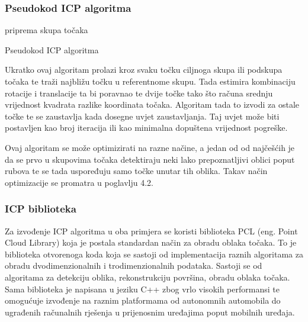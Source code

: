 \subsubsection{Pseudokod ICP algoritma}

\begin{algorithm}[H]
\SetAlgoLined
{}
 priprema skupa točaka\;
 \caption{Pseudokod ICP algoritma}
\end{algorithm}

Ukratko ovaj algoritam prolazi kroz svaku točku ciljnoga skupa ili podskupa točaka te traži najbližu točku u referentnome skupu. Tada estimira kombinaciju rotacije i translacije ta bi poravnao te dvije točke tako što računa srednju vrijednost kvadrata razlike koordinata točaka. Algoritam tada to izvodi za ostale točke te se zaustavlja kada dosegne uvjet zaustavljanja. Taj uvjet može biti postavljen kao broj iteracija ili kao minimalna dopuštena vrijednost pogreške.

Ovaj algoritam se može optimizirati na razne načine, a jedan od od najčešćih je da se prvo u skupovima točaka detektiraju neki lako prepoznatljivi oblici poput rubova te se tada uspoređuju samo točke unutar tih oblika. Takav način optimizacije se promatra u poglavlju 4.2.

\subsubsection{ICP biblioteka}

Za izvođenje ICP algoritma u oba primjera se koristi biblioteka PCL (eng. Point Cloud Library) koja je postala standardan način za obradu oblaka točaka. To je biblioteka otvorenoga koda koja se sastoji od implementacija raznih algoritama za obradu dvodimenzionalnih i trodimenzionalnih podataka. Sastoji se od algoritama za detekciju oblika, rekonstrukciju površina, obradu oblaka točaka. Sama biblioteka je napisana u jeziku C++ zbog vrlo visokih performansi te omogućuje izvođenje na raznim platformama od autonomnih automobila do ugrađenih računalnih rješenja u prijenosnim uređajima poput mobilnih uređaja.